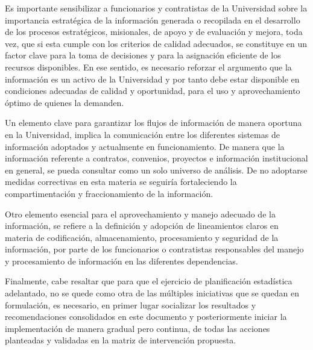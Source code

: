 \documentclass[
]{book}
\begin{document}
Es importante sensibilizar a funcionarios y contratistas de la Universidad sobre la importancia estratégica de la información generada o recopilada en el desarrollo de los procesos estratégicos, misionales, de apoyo y de evaluación y mejora, toda vez, que si esta cumple con los criterios de calidad adecuados, se constituye en un factor clave para la toma de decisiones y para la asignación eficiente de los recursos disponibles. En ese sentido, es necesario reforzar el argumento que la información es un activo de la Universidad y por tanto debe estar disponible en condiciones adecuadas de calidad y oportunidad, para el uso y aprovechamiento óptimo de quienes la demanden.

Un elemento clave para garantizar los flujos de información de manera oportuna en la Universidad, implica la comunicación entre los diferentes sistemas de información adoptados y actualmente en funcionamiento. De manera que la información referente a contratos, convenios, proyectos e información institucional en general, se pueda consultar como un solo universo de análisis. De no adoptarse medidas correctivas en esta materia se seguiría fortaleciendo la compartimentación y fraccionamiento de la información.

Otro elemento esencial para el aprovechamiento y manejo adecuado de la información, se refiere a la definición y adopción de lineamientos claros en materia de codificación, almacenamiento, procesamiento y seguridad de la información, por parte de los funcionarios o contratistas responsables del manejo y procesamiento de información en las diferentes dependencias.

Finalmente, cabe resaltar que para que el ejercicio de planificación estadística adelantado, no se quede como otra de las múltiples iniciativas que se quedan en formulación, es necesario, en primer lugar socializar los resultados y recomendaciones consolidados en este documento y posteriormente iniciar la implementación de manera gradual pero continua, de todas las acciones planteadas y validadas en la matriz de intervención propuesta.
\end{document}
